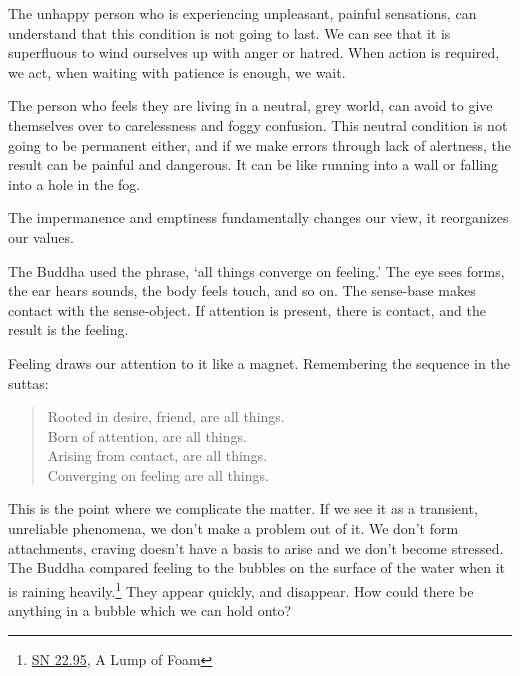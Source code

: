 The unhappy person who is experiencing unpleasant, painful sensations,
can understand that this condition is not going to last. We can see that
it is superfluous to wind ourselves up with anger or hatred. When action
is required, we act, when waiting with patience is enough, we wait.

The person who feels they are living in a neutral, grey world, can avoid
to give themselves over to carelessness and foggy confusion. This
neutral condition is not going to be permanent either, and if we make
errors through lack of alertness, the result can be painful and
dangerous. It can be like running into a wall or falling into a hole in
the fog.

The impermanence and emptiness fundamentally changes our view, it
reorganizes our values.

The Buddha used the phrase, `all things converge on feeling.' The eye
sees forms, the ear hears sounds, the body feels touch, and so on. The
sense-base makes contact with the sense-object. If attention is present,
there is contact, and the result is the feeling.

Feeling draws our attention to it like a magnet. Remembering the
sequence in the suttas:

\begin{quote}
Rooted in desire, friend, are all things.\\
Born of attention, are all things.\\
Arising from contact, are all things.\\
Converging on feeling are all things.

\bigskip

\end{quote}

\clearpage


This is the point where we complicate the matter. If we see it as a
transient, unreliable phenomena, we don't make a problem out of it. We
don't form attachments, craving doesn't have a basis to arise and we
don't become stressed. The Buddha compared feeling to the bubbles on the
surface of the water when it is raining heavily.\footnote{\href{https://suttacentral.net/sn22.95}{SN
  22.95}, A Lump of Foam} They appear quickly, and disappear. How could
there be anything in a bubble which we can hold onto?

